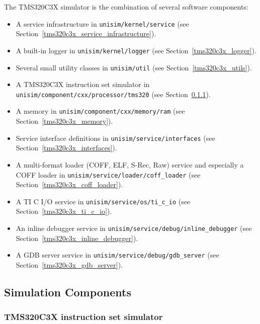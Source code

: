 The TMS320C3X simulator is the combination of several software components:
\begin{itemize}
\item A service infrastructure in \texttt{unisim/kernel/service} (see Section~\ref{tms320c3x_service_infrastructure}).
\item A built-in logger in \texttt{unisim/kernel/logger} (see Section~\ref{tms320c3x_logger}).
\item Several small utility classes in \texttt{unisim/util} (see Section~\ref{tms320c3x_utils}).
\item A TMS320C3X instruction set simulator in \texttt{unisim/component/cxx/processor/tms320} (see Section~\ref{tms320c3x_iss}).
\item A memory in \texttt{unisim/component/cxx/memory/ram} (see Section~\ref{tms320c3x_memory}).
\item Service interface definitions in \texttt{unisim/service/interfaces} (see Section~\ref{tms320c3x_interfaces}).
\item A multi-format loader (COFF, ELF, S-Rec, Raw) service and especially a COFF loader in \texttt{unisim/service/loader/coff\_loader} (see Section~\ref{tms320c3x_coff_loader}).
\item A TI C I/O service in \texttt{unisim/service/os/ti\_c\_io} (see Section~\ref{tms320c3x_ti_c_io}).
\item An inline debugger service in \texttt{unisim/service/debug/inline\_debugger} (see Section~\ref{tms320c3x_inline_debugger}).
\item A GDB server service in \texttt{unisim/service/debug/gdb\_server} (see Section~\ref{tms320c3x_gdb_server}).
\end{itemize}

\subsection{Simulation Components}

\subsubsection{TMS320C3X instruction set simulator}
\label{tms320c3x_iss}

